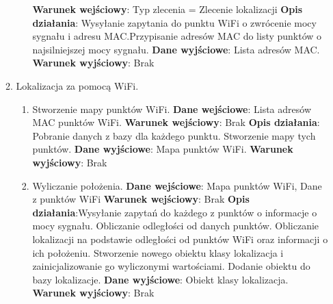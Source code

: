 \documentclass[11pt]{article}
\begin{document}
\begin{enumerate}
\begin{enumerate}[label*=\arabic*.]
\begin{enumerate}[label*=\arabic*.]
				\textbf{Warunek wejściowy}: Typ zlecenia = Zlecenie lokalizacji		\newline   	
				\textbf{Opis działania}: \newline Wysyłanie zapytania do punktu WiFi o zwrócenie mocy sygnału i adresu MAC.\newline Przypisanie adresów MAC do listy punktów o najsilniejszej mocy sygnału.	\newline
				\textbf{Dane wyjściowe}: Lista adresów MAC.	\newline
				\textbf{Warunek wyjściowy}: Brak
			\end{enumerate}
			\item Lokalizacja za pomocą WiFi.
			\begin{enumerate}[label*=\arabic*.]
				\item Stworzenie mapy punktów WiFi. \newline
				\textbf{Dane wejściowe}: Lista adresów MAC punktów WiFi.	\newline
				\textbf{Warunek wejściowy}: Brak	\newline   	
				\textbf{Opis działania}: \newline Pobranie danych z bazy dla każdego punktu. \newline Stworzenie mapy tych punktów.	\newline
				\textbf{Dane wyjściowe}: Mapa punktów WiFi.	\newline
				\textbf{Warunek wyjściowy}: Brak
				\item Wyliczanie położenia. \newline
				\textbf{Dane wejściowe}: Mapa punktów WiFi, Dane z punktów WiFi	\newline
				\textbf{Warunek wejściowy}: Brak		\newline   	
				\textbf{Opis działania}:\newline Wysyłanie zapytań do każdego z punktów o informacje o mocy sygnału. \newline Obliczanie odległości od danych punktów. \newline Obliczanie lokalizacji na podstawie odległości od punktów WiFi oraz informacji o ich położeniu. \newline Stworzenie nowego obiektu klasy lokalizacja i zainicjalizowanie go wyliczonymi wartościami. \newline Dodanie obiektu do bazy lokalizacje.	\newline
				\textbf{Dane wyjściowe}: Obiekt klasy lokalizacja.	\newline
				\textbf{Warunek wyjściowy}: Brak

\end{enumerate}
\end{enumerate}
\end{enumerate}
\end{document}
